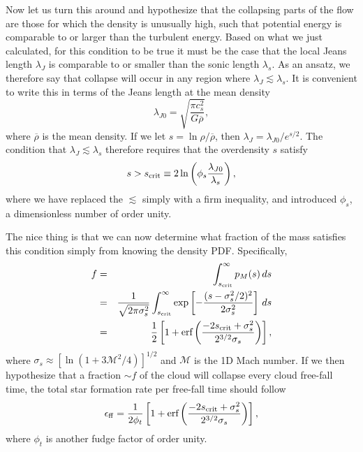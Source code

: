Now let us turn this around and hypothesize that the collapsing parts of the flow are those for which the density is unusually high, such that potential energy is comparable to or larger than the turbulent energy. Based on what we just calculated, for this condition to be true it must be the case that the local Jeans length $\lambda_J$ is comparable to or smaller than the sonic length $\lambda_s$. As an ansatz, we therefore say that collapse will occur in any region where $\lambda_J \lesssim \lambda_s$. It is convenient to write this in terms of the Jeans length at the mean density
\begin{equation}
\lambda_{J0}=\sqrt{\frac{\pi c_s^2}{G\overline{\rho}}},
\end{equation}
where $\overline{\rho}$ is the mean density. If we let $s = \ln \rho/\overline{\rho}$, then $\lambda_J = \lambda_{J0}/e^{s/2}$. The condition that $\lambda_J \lesssim \lambda_s$ therefore requires that the overdensity $s$ satisfy
\begin{equation}
s > s_{\rm crit} \equiv 2 \ln \left(\phi_s \frac{\lambda_{J0}}{\lambda_s}\right),
\end{equation}
where we have replaced the $\lesssim$ simply with a firm inequality, and introduced $\phi_s$, a dimensionless number of order unity.

The nice thing is that we can now determine what fraction of the mass satisfies this condition simply from knowing the density PDF. Specifically,
\begin{eqnarray}
f & = & \int_{s_{\rm crit}}^\infty p_M(s) \,ds \\
& = & \frac{1}{\sqrt{2\pi \sigma_s^2}}
\int_{s_{\rm crit}}^\infty \exp\left[-\frac{(s -\sigma_s^2/2)^2}{2\sigma_s^2}\right] \, ds \\
& = & \frac{1}{2} \left[1+\mbox{erf}\left(\frac{-2 s_{\rm crit}+\sigma_s^2}{2^{3/2}\sigma_s}\right)\right],
\end{eqnarray}
where $\sigma_s \approx [\ln(1+3\mathcal{M}^2/4)]^{1/2}$ and $\mathcal{M}$ is the 1D Mach number. If we then hypothesize that a fraction $\sim f$ of the cloud will collapse every cloud free-fall time, the total star formation rate per free-fall time should follow
\begin{equation}
\epsilon_{\rm ff} = \frac{1}{2 \phi_t} \left[1+\mbox{erf}\left(\frac{-2 s_{\rm crit}+\sigma_{s}^2}{2^{3/2}\sigma_s}\right)\right],
\end{equation}
where $\phi_t$ is another fudge factor of order unity.

